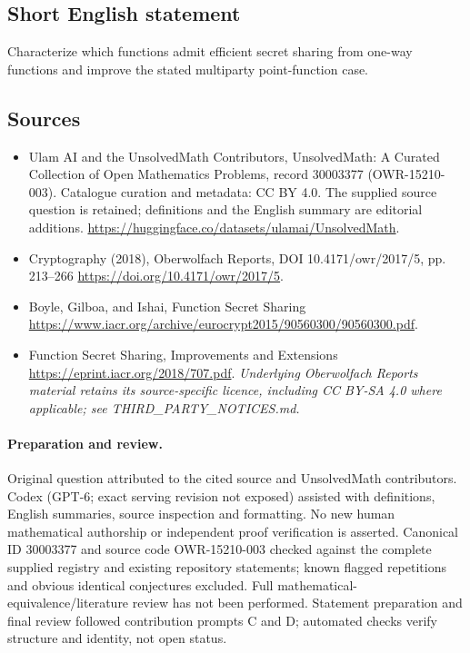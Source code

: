 \documentclass[11pt]{article}
\begin{document}
\subsection{Short English statement}
Characterize which functions admit efficient secret sharing from one-way functions and improve the stated multiparty point-function case.
\subsection{Sources}
\begin{itemize}
\item[\hypertarget{source:30003377:1}{S1}] Ulam AI and the UnsolvedMath Contributors, UnsolvedMath: A Curated Collection of Open Mathematics Problems, record 30003377 (OWR-15210-003). Catalogue curation and metadata: CC BY 4.0. The supplied source question is retained; definitions and the English summary are editorial additions.
\url{https://huggingface.co/datasets/ulamai/UnsolvedMath}.
\item[\hypertarget{source:30003377:2}{S2}] Cryptography (2018), Oberwolfach Reports, DOI 10.4171/owr/2017/5, pp. 213--266
\url{https://doi.org/10.4171/owr/2017/5}.
\item[\hypertarget{source:30003377:3}{S3}] Boyle, Gilboa, and Ishai, Function Secret Sharing
\url{https://www.iacr.org/archive/eurocrypt2015/90560300/90560300.pdf}.
\item[\hypertarget{source:30003377:4}{S4}] Function Secret Sharing, Improvements and Extensions
\url{https://eprint.iacr.org/2018/707.pdf}.
\textit{Underlying Oberwolfach Reports material retains its source-specific licence, including CC BY-SA 4.0 where applicable; see THIRD\_PARTY\_NOTICES.md.}
\end{itemize}
\paragraph{Preparation and review.}
Original question attributed to the cited source and UnsolvedMath contributors. Codex (GPT-6; exact serving revision not exposed) assisted with definitions, English summaries, source inspection and formatting. No new human mathematical authorship or independent proof verification is asserted. Canonical ID 30003377 and source code OWR-15210-003 checked against the complete supplied registry and existing repository statements; known flagged repetitions and obvious identical conjectures excluded. Full mathematical-equivalence/literature review has not been performed. Statement preparation and final review followed contribution prompts C and D; automated checks verify structure and identity, not open status.
\label{end:30003377}
\end{document}
